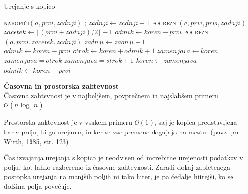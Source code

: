 \documentclass[a4paper,oneside,12pt]{article}
\newcommand{\subsubsubsection}[1]{\vspace*{1ex}\textbf{#1}\\}
\begin{document}
\begin{algorithm}[h!t!]
  \caption{Urejanje s kopico}\label{algo:heapsort}
  \begin{algorithmic}[1]
        \State \textsc{nakopiči}$(a, prvi, zadnji)$
            ;
            \State $zadnji \gets zadnji - 1$
            \State \textsc{pogrezni}$(a, prvi, prvi, zadnji)$
        \EndWhile
    \EndFunction
    \\
        \State $zacetek \gets \lfloor(prvi + zadnji) / 2\rfloor - 1$
         
            \State $odmik \gets koren - prvi$
            \State \textsc{pogrezni}$(a, prvi, zacetek, zadnji)$
            \State $zadnji \gets zadnji - 1$
        \EndWhile
    \EndFunction
    \\
        \State $odmik \gets koren - prvi$
         
            \State $otrok \gets koren + odmik + 1$
            \State $zamenjava \gets koren$ 
             
            \State $zamenjava = otrok$
            \EndIf {}
                \State $zamenjava = otrok + 1$
            \EndIf
                \State $koren \gets zamenjava$
                \State $odmik \gets koren - prvi$
            \Else
                \State \Return 
            \EndIf
        \EndWhile
    \EndFunction
  \end{algorithmic}
\end{algorithm}

\subsubsubsection{Časovna in prostorska zahtevnost}
Časovna zahtevnost je v najboljšem, povprečnem in najslabšem primeru $\mathcal{O}(n\log_2 n)$.

Prostorska zahtevnost je v vsakem primeru $\mathcal{O}(1)$, saj je kopica predstavljena kar v
polju, ki ga urejamo, in ker se vse premene dogajajo na mestu.
(povz. po Wirth, 1985, str. 123)

Čas izvajanja urejanja s kopico je neodvisen od morebitne urejenosti podatkov v polju,
kot lahko razberemo iz časovne zahtevnosti. Zaradi dokaj zapletenega postopka urejanja
na manjših poljih ni tako hiter, je pa čedalje hitrejši, ko se dolžina polja
povečuje.
\end{document}
